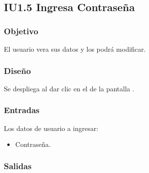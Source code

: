 \newpage
\subsection{IU1.5 Ingresa Contraseña}

\subsubsection{Objetivo}
	El usuario vera sus datos y los podrá modificar.  

\subsubsection{Diseño}
	Se despliega al dar clic en el  de la pantalla .


\subsubsection{Entradas}
Los datos de usuario a ingresar:
\begin{itemize}	
	\item Contraseña.
\end{itemize}

\subsubsection{Salidas}
\begin{Citemize}
	\item {}
	\item {}
\end{Citemize} 